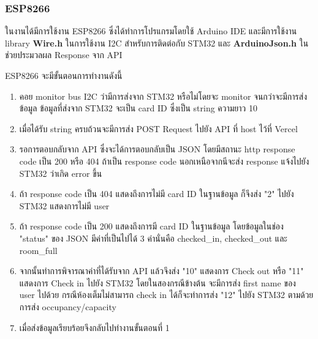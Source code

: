 \documentclass[fontsize=14pt]{extarticle}
\begin{document}
\subsubsection{ESP8266}
\par ในงานได้มีการใช้งาน ESP8266 ซึ่งได้ทำการโปรแกรมโดยใช้ Arduino IDE และมีการใช้งาน library \textbf{Wire.h} ในการใช้งาน I2C สำหรับการติดต่อกับ STM32
และ \textbf{ArduinoJson.h} ในช่วยประมวลผล Response จาก API
\par ESP8266 จะมีขั้นตอนการทำงานดังนี้
\begin{enumerate}
    \item คอย monitor bus I2C ว่ามีการส่งจาก STM32 หรือไม่โดยจะ monitor จนกว่าจะมีการส่งข้อมูล ข้อมูลที่ส่งจาก STM32 จะเป็น card ID ซึ่งเป็น string ความยาว 10
    \item เมื่อได้รับ string ครบถ้วนจะมีการส่ง POST Request ไปยัง API ที่ host ไว้ที่ Vercel
    \item รอการตอบกลับจาก API ซึ่งจะได้การตอบกลับเป็น JSON โดยมีสถานะ http response code เป็น 200 หรือ 404 ถ้าเป็น response code นอกเหนือจากนีจะส่ง response แจ้งไปยัง STM32 ว่าเกิด error ขึ้น
    \item ถ้า response code เป็น 404 แสดงถึงการไม่มี card ID ในฐานข้อมูล ก็จึงส่ง "2" ไปยัง STM32 แสดงการไม่มี user
    \item ถ้า response code เป็น 200 แสดงถึงการมี card ID ในฐานข้อมูล โดยข้อมูลในช่อง "status" ของ JSON มีค่าที่เป็นไปได้ 3 ค่านั่นคือ checked\_in, checked\_out และ room\_full
    \item จากนั้นทำการพิจารณาค่าที่ได้รับจาก API แล้วจึงส่ง "10" แสดงการ Check out หรือ "11" แสดงการ Check in ไปยัง STM32 โดยในสองกรณีข้างต้น จะมีการส่ง first name ของ user ไปด้วย กรณีห้องเต็มไม่สามารถ check in ได้ก็จะทำการส่ง "12" ไปยัง STM32 ตามด้วยการส่ง occupancy/capacity
    \item เมื่อส่งข้อมูลเรียบร้อยจึงกลับไปทำงานขั้นตอนที่ 1
\end{enumerate}
\end{document}
